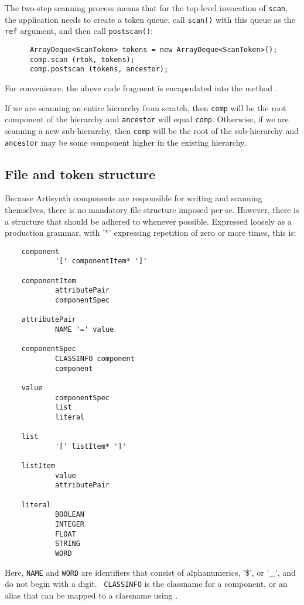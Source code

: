 \documentclass{article}
\begin{document}
The two-step scanning process means that for the top-level
invocation of {\tt scan}, the application 
needs to create a token queue, call {\tt scan()} with this
queue as the {\tt ref} argument, and then call {\tt postscan()}:
\begin{lstlisting}
      ArrayDeque<ScanToken> tokens = new ArrayDeque<ScanToken>();
      comp.scan (rtok, tokens);
      comp.postscan (tokens, ancestor);
\end{lstlisting}
For convenience, the above code fragment is encapsulated into the
method .

If we are scanning an entire hierarchy from scratch, then {\tt comp}
will be the root component of the hierarchy and {\tt ancestor} will
equal {\tt comp}. Otherwise, if we are scanning a new sub-hierarchy,
then {\tt comp} will be the root of the sub-hierarchy and {\tt
ancestor} may be some component higher in the existing hierarchy.

\subsection{File and token structure}
\label{fileStructureSec}

Because Artisynth components are responsible for writing and scanning
themselves, there is no mandatory file structure imposed per-se.
However, there is a structure that should be adhered to whenever
possible. Expressed loosely as a production grammar, with '*'
expressing repetition of zero or more times, this is:
\begin{lstlisting}
    component
            '[' componentItem* ']'
    
    componentItem
            attributePair
            componentSpec
    
    attributePair
            NAME '=' value
    
    componentSpec
            CLASSINFO component
            component
    
    value
            componentSpec
            list
            literal
    
    list
            '[' listItem* ']'
    
    listItem
            value
            attributePair
    
    literal
            BOOLEAN
            INTEGER
            FLOAT
            STRING
            WORD
\end{lstlisting}
Here, {\tt NAME} and {\tt WORD} are identifiers that consist of
alphanumerics, '\$', or '\_', and do not begin with a digit. {\tt
CLASSINFO} is the classname for a component, or an alias that can be
mapped to a classname using
.
\end{document}
